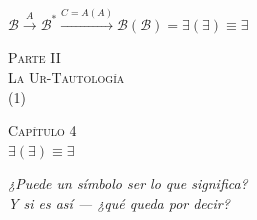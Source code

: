 \documentclass[10pt, openany, oneside]{book}
\renewcommand{\normalsize}{\fontsize{10}{13}\selectfont}
\renewcommand{\large}{\fontsize{11.5}{14}\selectfont}
\renewcommand{\LARGE}{\fontsize{15}{18}\selectfont}
\renewcommand{\huge}{\fontsize{17}{21}\selectfont}
\begin{document}
\vspace{0.5em}

\begin{center}
    $\mathcal{B} \xrightarrow{A} \mathcal{B}^* \xrightarrow{C = A(A)} \mathcal{B}(\mathcal{B}) = \exists(\exists) \equiv \exists$
\end{center}

%
%
%
%

%
%

\newpage
\thispagestyle{empty}
\vspace*{\fill}
\begin{center}
    {\LARGE\scshape Parte II}\\[1em]
    {\large\scshape La Ur-Tautología}\\[0.5em]
    {\normalsize (1)}
\end{center}
\vspace*{\fill}
\newpage


\newpage

\begin{center}
    {\huge\scshape Capítulo 4}\\[0.3em]
    {\large $\exists(\exists) \equiv \exists$}
\end{center}

\vspace{1.5em}

\begin{center}
    \itshape
    ¿Puede un símbolo ser lo que significa?\\
    Y si es así --- ¿qué queda por decir?
\end{center}

\vspace{2em}
\end{document}
